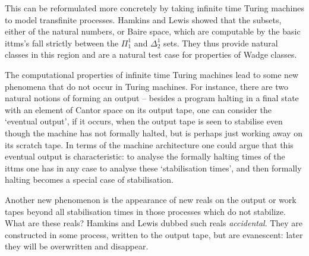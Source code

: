 \documentclass[a4paper,11pt]{amsart}
\theoremstyle{definition}
\newtheorem*{problem A}{Problem 1}
\newtheorem*{problem B}{Problem 2}
\theoremstyle{remark}
\begin{document}
This can be reformulated more concretely by taking infinite time Turing machines to model transfinite processes. 
Hamkins and Lewis  \cite{hamkins2000infinite} showed that the subsets, either of the natural numbers, or Baire space, which are computable by the basic ittms's fall strictly between the $\Pi^1_1$ and $\Delta^1_2$ sets.
They thus provide natural classes in this region and are a natural test case for properties of Wadge classes. 

The computational properties of infinite time Turing machines lead to some new phenomena that do not occur in Turing machines. 
For instance, there are two natural notions of forming an output -- besides a program halting in a final state with an element of Cantor space on its output tape, one can consider the `eventual output', if it occurs, when the output tape is seen to stabilise even though the machine has not formally halted, but is perhaps just working away on its scratch tape. In terms of the machine architecture one could argue that this eventual output is characteristic: to analyse the formally halting times of the ittms one has in any case to analyse these `stabilisation times', and then formally halting becomes a special case of stabilisation.


Another new phenomenon is the appearance of new reals on the output or work tapes beyond all 
stabilisation times in those processes which do {\em } not stabilize. What are these reals? Hamkins and Lewis dubbed such reals {\em accidental}. They are constructed in some process, written to the output tape, but are evanescent: later they will be overwritten and disappear.
\end{document}
